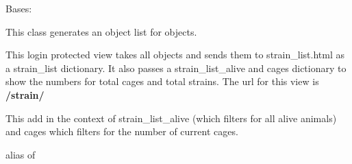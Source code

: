 \documentclass[letterpaper,10pt,english]{sphinxmanual}
\begin{document}

\begin{fulllineitems}
\label{api:mousedb.animal.views.StrainList}
Bases: {\hyperref[api:mousedb.views.ProtectedListView]{}}

This class generates an object list for {\hyperref[api:mousedb.animal.models.Strain]{}} objects.

This login protected view takes all {\hyperref[api:mousedb.animal.models.Strain]{}} objects and sends them to strain\_list.html as a strain\_list dictionary.  It also passes a strain\_list\_alive and cages dictionary to show the numbers for total cages and total strains.
The url for this view is \textbf{/strain/}

\begin{fulllineitems}
\label{api:mousedb.animal.views.StrainList.context_object_name}
\end{fulllineitems}


\begin{fulllineitems}
\label{api:mousedb.animal.views.StrainList.get_context_data}
This add in the context of strain\_list\_alive (which filters for all alive animals) and cages which filters for the number of current cages.

\end{fulllineitems}


\begin{fulllineitems}
\label{api:mousedb.animal.views.StrainList.model}
alias of 

\end{fulllineitems}


\begin{fulllineitems}
\label{api:mousedb.animal.views.StrainList.template_name}
\end{fulllineitems}


\end{fulllineitems}
\end{document}
